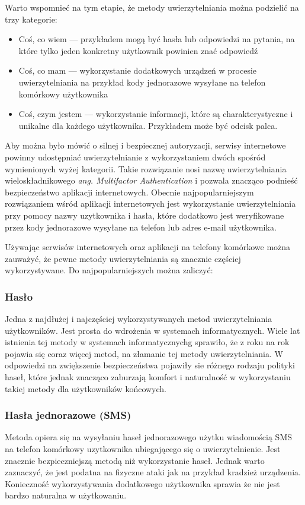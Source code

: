 Warto wspomnieć na tym etapie, że metody uwierzytelniania można podzielić na trzy kategorie:
\begin{itemize}
  \item Coś, co wiem --- przykładem mogą być hasła lub odpowiedzi na pytania, na które tylko jeden konkretny użytkownik powinien znać odpowiedź
  \item Coś, co mam --- wykorzystanie dodatkowych urządzeń w procesie uwierzytelniania na przykład kody jednorazowe wysyłane na telefon komórkowy użytkownika
  \item Coś, czym jestem --- wykorzystanie informacji, które są charakterystyczne i unikalne dla każdego użytkownika. Przykładem może być odcisk palca.
\end{itemize}

Aby można było mówić o silnej i bezpiecznej autoryzacji, serwisy internetowe powinny udostępniać uwierzytelnianie z wykorzystaniem dwóch spośród wymienionych wyżej kategorii. Takie rozwiązanie nosi nazwę uwierzytelniania wieloskładnikowego \emph{ang. Multifactor Authentication} i pozwala znacząco podnieść bezpieczeństwo aplikacji internetowych. Obecnie najpopularniejszym rozwiązaniem wśród aplikacji internetowych jest wykorzystanie uwierzytelniania przy pomocy nazwy uzytkownika i hasła, które dodatkowo jest weryfikowane przez kody jednorazowe wysyłane na telefon lub adres e-mail użytkownika.

Używając serwisów internetowych oraz aplikacji na telefony komórkowe można zauważyć, że pewne metody uwierzytelniania są znacznie częściej wykorzystywane. Do najpopularniejszych można zaliczyć:
\subsubsection{Hasło} Jedna z najdłużej i najczęściej wykorzystywanych metod uwierzytelniania użytkowników. Jest prosta do wdrożenia w systemach informatycznych. Wiele lat istnienia tej metody w systemach informatycznychg sprawiło, że z roku na rok pojawia się coraz więcej metod, na złamanie tej metody uwierzytelniania. W odpowiedzi na zwiększenie bezpieczeństwa pojawiły sie różnego rodzaju polityki haseł, które jednak znacząco zaburzają komfort i naturalność w wykorzystaniu takiej metody dla użytkowników końcowych.
\subsubsection{Hasła jednorazowe (SMS)} Metoda opiera się na wysyłaniu haseł jednorazowego użytku wiadomością SMS na telefon komórkowy uzytkownika ubiegającego się o uwierzytelnienie. Jest znacznie bezpieczniejszą metodą niż wykorzystanie haseł. Jednak warto zaznaczyć, że jest podatna na fizyczne ataki jak na przykład kradzież urządzenia. Konieczność wykorzystywania dodatkowego użytkownika sprawia że nie jest bardzo naturalna w użytkowaniu.
